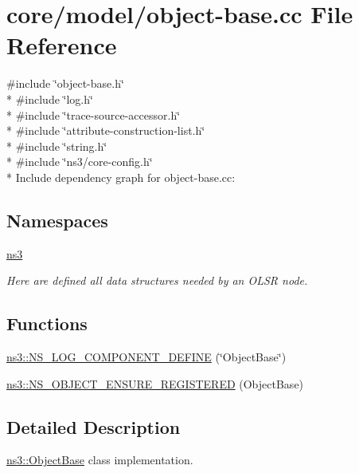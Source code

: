 \hypertarget{object-base_8cc}{}\section{core/model/object-\/base.cc File Reference}
\label{object-base_8cc}
{\ttfamily \#include \char`\"{}object-\/base.\+h\char`\"{}}\\*
{\ttfamily \#include \char`\"{}log.\+h\char`\"{}}\\*
{\ttfamily \#include \char`\"{}trace-\/source-\/accessor.\+h\char`\"{}}\\*
{\ttfamily \#include \char`\"{}attribute-\/construction-\/list.\+h\char`\"{}}\\*
{\ttfamily \#include \char`\"{}string.\+h\char`\"{}}\\*
{\ttfamily \#include \char`\"{}ns3/core-\/config.\+h\char`\"{}}\\*
Include dependency graph for object-\/base.cc\+:
\subsection*{Namespaces}
\begin{DoxyCompactItemize}
\item 
 \hyperlink{namespacens3}{ns3}
\begin{DoxyCompactList}\small\item\em Here are defined all data structures needed by an O\+L\+SR node. \end{DoxyCompactList}\end{DoxyCompactItemize}
\subsection*{Functions}
\begin{DoxyCompactItemize}
\item 
\hyperlink{namespacens3_adcbb6c5c3a7bfb3bb37fada4ae0d740e}{ns3\+::\+N\+S\+\_\+\+L\+O\+G\+\_\+\+C\+O\+M\+P\+O\+N\+E\+N\+T\+\_\+\+D\+E\+F\+I\+NE} (\char`\"{}Object\+Base\char`\"{})
\item 
\hyperlink{namespacens3_a090f0154d4d5b4abdebe6718d0f6b3f8}{ns3\+::\+N\+S\+\_\+\+O\+B\+J\+E\+C\+T\+\_\+\+E\+N\+S\+U\+R\+E\+\_\+\+R\+E\+G\+I\+S\+T\+E\+R\+ED} (Object\+Base)
\end{DoxyCompactItemize}


\subsection{Detailed Description}
\hyperlink{classns3_1_1ObjectBase}{ns3\+::\+Object\+Base} class implementation. 
